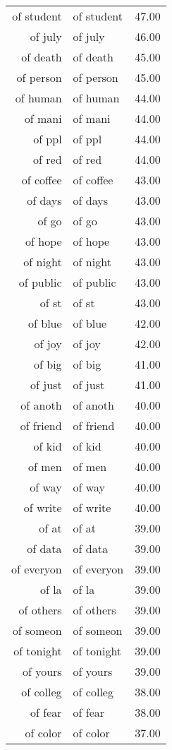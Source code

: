 \begin{table}[ht]
\begin{tabular}{rlr}
  of student & of student & 47.00 \\ 
  of july & of july & 46.00 \\ 
  of death & of death & 45.00 \\ 
  of person & of person & 45.00 \\ 
  of human & of human & 44.00 \\ 
  of mani & of mani & 44.00 \\ 
  of ppl & of ppl & 44.00 \\ 
  of red & of red & 44.00 \\ 
  of coffee & of coffee & 43.00 \\ 
  of days & of days & 43.00 \\ 
  of go & of go & 43.00 \\ 
  of hope & of hope & 43.00 \\ 
  of night & of night & 43.00 \\ 
  of public & of public & 43.00 \\ 
  of st & of st & 43.00 \\ 
  of blue & of blue & 42.00 \\ 
  of joy & of joy & 42.00 \\ 
  of big & of big & 41.00 \\ 
  of just & of just & 41.00 \\ 
  of anoth & of anoth & 40.00 \\ 
  of friend & of friend & 40.00 \\ 
  of kid & of kid & 40.00 \\ 
  of men & of men & 40.00 \\ 
  of way & of way & 40.00 \\ 
  of write & of write & 40.00 \\ 
  of at & of at & 39.00 \\ 
  of data & of data & 39.00 \\ 
  of everyon & of everyon & 39.00 \\ 
  of la & of la & 39.00 \\ 
  of others & of others & 39.00 \\ 
  of someon & of someon & 39.00 \\ 
  of tonight & of tonight & 39.00 \\ 
  of yours & of yours & 39.00 \\ 
  of colleg & of colleg & 38.00 \\ 
  of fear & of fear & 38.00 \\ 
  of color & of color & 37.00 \\ 

\end{tabular}
\end{table}
